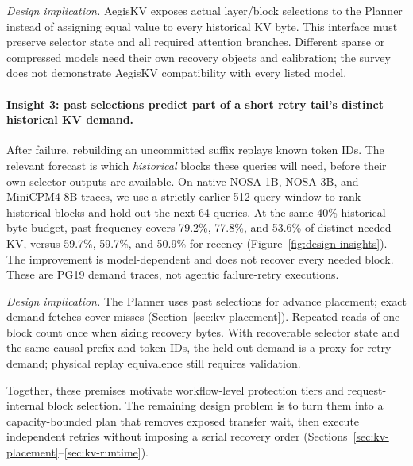 \emph{Design implication.} AegisKV exposes actual layer/block selections
to the Planner instead of assigning equal value to every historical
KV byte. This interface must preserve selector state and all required
attention branches. Different sparse or compressed models need their
own recovery objects and calibration; the survey does not demonstrate
AegisKV compatibility with every listed model.

\paragraph{Insight 3: past selections predict part of a short retry
tail's distinct historical KV demand.}
After failure, rebuilding an uncommitted suffix replays known token IDs.
The relevant forecast is which \emph{historical} blocks these queries
will need, before their own selector outputs are available. On native
NOSA-1B, NOSA-3B, and MiniCPM4-8B traces, we use a strictly earlier
512-query window to rank historical blocks and hold out the next
64 queries. At the same 40\% historical-byte budget, past frequency
covers 79.2\%, 77.8\%, and 53.6\% of distinct needed KV, versus
59.7\%, 59.7\%, and 50.9\% for recency
(Figure~\ref{fig:design-insights}).
The improvement is model-dependent and does not recover every needed
block. These are PG19 demand traces, not agentic failure-retry executions.

\emph{Design implication.} The Planner uses past selections for advance
placement; exact demand fetches cover misses (Section~\ref{sec:kv-placement}).
Repeated reads of one block count once when sizing recovery bytes.
With recoverable selector state and the same causal prefix and token
IDs, the held-out demand is a proxy for retry demand; physical replay
equivalence still requires validation.

Together, these premises motivate workflow-level protection tiers and
request-internal block selection. The remaining design problem is to
turn them into a capacity-bounded plan that removes exposed transfer
wait, then execute independent retries without imposing a serial
recovery order (Sections~\ref{sec:kv-placement}--\ref{sec:kv-runtime}).
